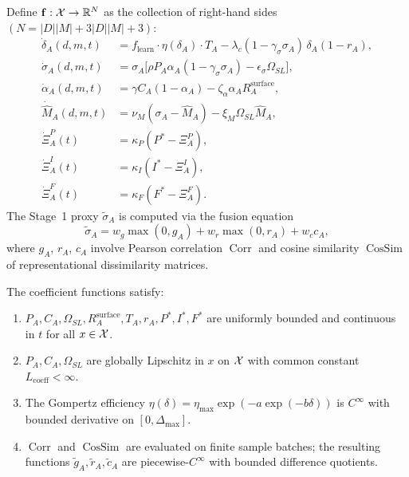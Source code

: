 \begin{definition}
\label{def:vector-field}
Define $\mathbf{f}: \mathcal{X} \to \mathbb{R}^N$ as the collection of right-hand sides
$(N = |D||M| + 3|D||M| + 3)$:
\begin{align}
\dot{\delta}_A(d,m,t) &= f_{\mathrm{learn}} \cdot \eta(\delta_A) \cdot T_A
 - \lambda_c (1 - \gamma_\sigma \sigma_A)\,\delta_A (1 - r_A), \label{eq:delta-ode} \\
\dot{\sigma}_A(d,m,t) &=
 \sigma_A\bigl[ \rho P_A \alpha_A (1 - \gamma_\sigma \sigma_A)
 - \epsilon_\sigma \Omega_{SL} \bigr], \label{eq:sigma-ode} \\
\dot{\alpha}_A(d,m,t) &=
 \gamma C_A (1 - \alpha_A) - \zeta_\alpha \alpha_A R_A^{\mathrm{surface}}, \label{eq:alpha-ode} \\
\dot{\hat{M}}_A(d,m,t) &=
 \nu_M (\sigma_A - \hat{M}_A) - \xi_M \Omega_{SL} \hat{M}_A, \label{eq:mhat-ode} \\
\dot{\Xi}_A^P(t) &= \kappa_P (P^* - \Xi_A^P), \label{eq:xiP-ode} \\
\dot{\Xi}_A^I(t) &= \kappa_I (I^* - \Xi_A^I), \label{eq:xiI-ode} \\
\dot{\Xi}_A^F(t) &= \kappa_F (F^* - \Xi_A^F). \label{eq:xiF-ode}
\end{align}
The Stage~1 proxy $\tilde{\sigma}_A$ is computed via the fusion equation
\[
\tilde{\sigma}_A = w_g \max(0, g_A) + w_r \max(0, r_A) + w_c c_A,
\]
where $g_A$, $r_A$, $c_A$ involve Pearson correlation $\operatorname{Corr}$
and cosine similarity $\operatorname{CosSim}$ of representational
dissimilarity matrices.
\end{definition}

\begin{assumption}
\label{assum:regularity}
The coefficient functions satisfy:
\begin{enumerate}
\item $P_A, C_A, \Omega_{SL}, R_A^{\mathrm{surface}}, T_A, r_A, P^*, I^*, F^*$
  are uniformly bounded and continuous in $t$ for all $x \in \mathcal{X}$.
\item $P_A, C_A, \Omega_{SL}$ are globally Lipschitz in $x$ on $\mathcal{X}$
  with common constant $L_{\mathrm{coeff}} < \infty$.
\item The Gompertz efficiency $\eta(\delta) = \eta_{\max} \exp(-a \exp(-b \delta))$
  is $C^\infty$ with bounded derivative on $[0, \Delta_{\max}]$.
\item $\operatorname{Corr}$ and $\operatorname{CosSim}$ are evaluated on
  finite sample batches; the resulting functions $\tilde{g}_A, \tilde{r}_A,
  \tilde{c}_A$ are piecewise-$C^\infty$ with bounded difference quotients.
\end{enumerate}
\end{assumption}

